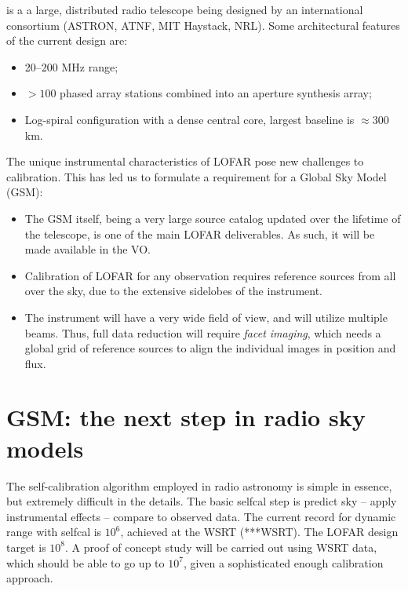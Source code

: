 \documentclass[11pt,twoside]{article}  %
\begin{document}
 is a a large, distributed
radio telescope being designed by an international consortium (ASTRON, ATNF,
MIT Haystack, NRL). Some architectural features of the current design are:

\begin{itemize}
\item 20--200 MHz range;
\item $>100$ phased array stations combined into an aperture synthesis array;
\item Log-spiral configuration with a dense central core, largest baseline is
$\approx$300 km.
\end{itemize}

The unique instrumental characteristics of LOFAR pose new challenges to
calibration. This has led us to formulate a requirement for a Global Sky Model
(GSM):

\begin{itemize}

\item The GSM itself, being a very large source catalog updated over the
lifetime of the telescope, is one of the main LOFAR deliverables. As such, it
will be made available in the VO.

\item Calibration of LOFAR for any observation requires reference sources from
all over the sky, due to the extensive sidelobes of the instrument.

\item The instrument will have a very wide field of view, and will utilize
multiple beams. Thus, full data reduction will require {\em facet imaging},
which needs a global grid of reference sources to align the individual images
in position and flux.

\end{itemize}

\section{GSM: the next step in radio sky models}

The self-calibration algorithm employed in radio astronomy is simple in
essence, but extremely difficult in the details. The basic selfcal step is
predict sky -- apply instrumental effects -- compare to observed data. The
current record for dynamic range with selfcal is $10^6$, achieved at the WSRT
(***WSRT). The LOFAR design target is $10^8$. A proof of concept study will be
carried out using WSRT data, which should be able to go up to $10^7$, given a
sophisticated enough calibration approach.
\end{document}

